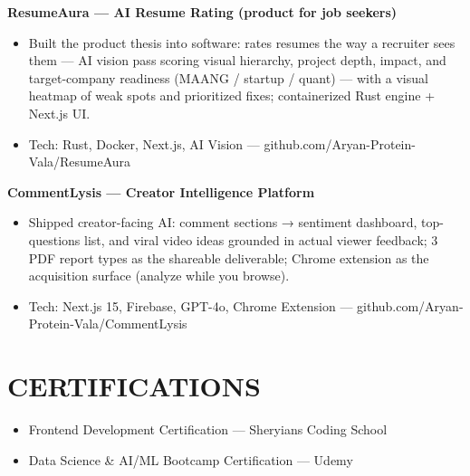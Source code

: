 \documentclass[9pt]{article}
\begin{document}
\textbf{ResumeAura  ---  AI Resume Rating (product for job seekers)}
\vspace{1pt}
\begin{itemize}[leftmargin=11pt,itemsep=0pt,topsep=1pt,parsep=0pt]
\item Built the product thesis into software: rates resumes the way a recruiter sees them  ---  AI vision pass scoring visual hierarchy, project depth, impact, and target-company readiness (MAANG / startup / quant)  ---  with a visual heatmap of weak spots and prioritized fixes; containerized Rust engine + Next.js UI.
\item Tech: Rust, Docker, Next.js, AI Vision  ---  github.com/Aryan-Protein-Vala/ResumeAura
\end{itemize}
\textbf{CommentLysis  ---  Creator Intelligence Platform}
\vspace{1pt}
\begin{itemize}[leftmargin=11pt,itemsep=0pt,topsep=1pt,parsep=0pt]
\item Shipped creator-facing AI: comment sections → sentiment dashboard, top-questions list, and viral video ideas grounded in actual viewer feedback; 3 PDF report types as the shareable deliverable; Chrome extension as the acquisition surface (analyze while you browse).
\item Tech: Next.js 15, Firebase, GPT-4o, Chrome Extension  ---  github.com/Aryan-Protein-Vala/CommentLysis
\end{itemize}
\section*{CERTIFICATIONS}
\begin{itemize}[leftmargin=11pt,itemsep=0pt,topsep=1pt,parsep=0pt]
\item Frontend Development Certification  ---  Sheryians Coding School
\item Data Science \& AI/ML Bootcamp Certification  ---  Udemy
\end{itemize}
\end{document}
